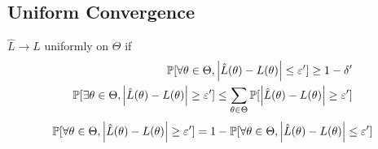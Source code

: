 \documentclass[11pt]{article}
\begin{document}
	\subsection{Uniform Convergence}
	$\hat{L} \to L$ uniformly on $\Theta$ if 
	\begin{align}
		\mathbb{P}[{\forall \theta \in \Theta, \left \vert {\hat{L}(\theta) - L(\theta)} \right \vert \leq \varepsilon'}] \geq 1 - \delta' \\
		\mathbb{P}[{\exists \theta \in \Theta, \left \vert {\hat{L}(\theta) - L(\theta)} \right \vert \geq \varepsilon'}] 
		\leq \sum_{\theta \in \Theta} \mathbb{P}[{\left \vert {\hat{L}(\theta) - L(\theta)} \right \vert \geq \varepsilon'}]
	\end{align}
	\begin{align}
		\mathbb{P}[{\forall \theta \in \Theta, \left \vert {\hat{L}(\theta) - L(\theta)} \right \vert \geq \varepsilon'}] = 1 - \mathbb{P}[{\forall \theta \in \Theta, \left \vert {\hat{L}(\theta) - L(\theta)} \right \vert \leq \varepsilon'}]
	\end{align}
\end{document}
